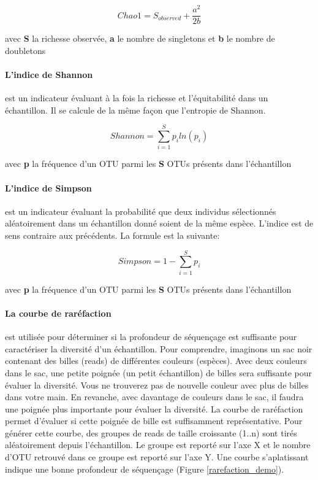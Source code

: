 \documentclass[12pt,a4paper]{article}
\begin{document}
\begin{mycapequ}[!h]
   \begin{equation}
     Chao1 = S_{observed} + \frac{a^2}{2b}
   \end{equation}
      \caption{avec \textbf{S} la richesse observée, \textbf{a} le nombre de singletons et \textbf{b} le nombre de doubletons}
\end{mycapequ}

\paragraph{L'indice de Shannon} est un indicateur évaluant à la fois la richesse et l'équitabilité dans un échantillon. Il se calcule de la même façon que l’entropie de Shannon.

\begin{mycapequ}[!h]
   \begin{equation}
     Shannon = \sum_{i=1}^Sp_{i}ln(p_{i})
   \end{equation}
      \caption{avec \textbf{p} la fréquence d'un OTU parmi les \textbf{S} OTUs présents dans l'échantillon}
\end{mycapequ}

\paragraph{L'indice de Simpson}est un indicateur évaluant la probabilité que deux individus sélectionnés aléatoirement dans un échantillon donné soient de la même espèce. L'indice est de sens contraire aux précédents. La formule est la suivante:

\begin{mycapequ}[!h]
   \begin{equation}
     Simpson = 1 - \sum_{i=1}^Sp_{i}
   \end{equation}
      \caption{avec \textbf{p} la fréquence d'un OTU parmi les \textbf{S} OTUs présents dans l'échantillon}
\end{mycapequ}

\paragraph{La courbe de raréfaction}est utilisée pour déterminer si la profondeur de séquençage est suffisante pour caractériser la diversité d’un échantillon. Pour comprendre, imaginons un sac noir contenant des billes (reads) de différentes couleurs (espèces). Avec deux couleurs dans le sac, une petite poignée (un petit échantillon) de billes sera suffisante pour évaluer la diversité. Vous ne trouverez pas de nouvelle couleur avec plus de billes dans votre main. En revanche, avec davantage de couleurs dans le sac, il faudra une poignée plus importante pour évaluer la diversité. La courbe de raréfaction permet d'évaluer si cette poignée de bille est suffisamment représentative.
Pour générer cette courbe, des groupes de reads de taille croissante (1..n) sont tirés aléatoirement depuis l'échantillon. Le groupe est reporté sur l'axe X et le nombre d'OTU retrouvé dans ce groupe est reporté sur l’axe Y.
Une courbe s’aplatissant indique une bonne profondeur de séquençage (Figure \ref{rarefaction_demo}).
\end{document}
